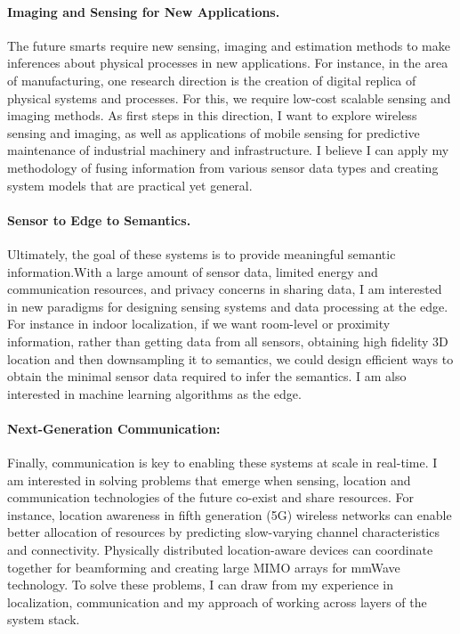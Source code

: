 \documentclass[10pt]{article}
\begin{document}
\paragraph{Imaging and Sensing for New Applications. }
The future smarts require  new sensing, imaging and estimation methods to make inferences about physical processes in new applications. For instance, in the area of manufacturing, one research direction is the creation of digital replica of physical systems and processes. For this, we require low-cost scalable sensing and imaging methods.  As first steps in this direction, I want to explore wireless sensing and imaging, as well as applications of mobile sensing for predictive maintenance of industrial machinery and infrastructure. I believe I can apply my methodology of fusing information from various sensor data types and creating system models that are practical yet general.

\paragraph{Sensor to Edge to Semantics. }
Ultimately, the goal of these systems is to provide meaningful semantic information.With a large amount of sensor data, limited energy and communication resources, and privacy concerns in sharing data, I am interested in new paradigms for designing sensing systems and data processing at the edge. For instance in indoor localization, if we want room-level or proximity information, rather than getting data from all sensors, obtaining high fidelity 3D location and then downsampling it to semantics, we could design efficient ways to obtain the minimal sensor data required to infer the semantics. I am also interested in machine learning algorithms as the edge. %

\paragraph{Next-Generation Communication: }
Finally, communication is key to enabling these systems at scale in real-time. %
I am interested in solving problems that emerge when sensing, location and communication technologies of the future co-exist and share resources. For instance, location awareness in fifth generation (5G) wireless networks can enable better allocation of resources by predicting slow-varying channel characteristics and connectivity. Physically distributed location-aware devices can coordinate together for beamforming and creating large MIMO arrays for mmWave technology. %
To solve these problems, I can draw from my experience in localization, communication and my approach of working across layers of the system stack. 
\end{document}
